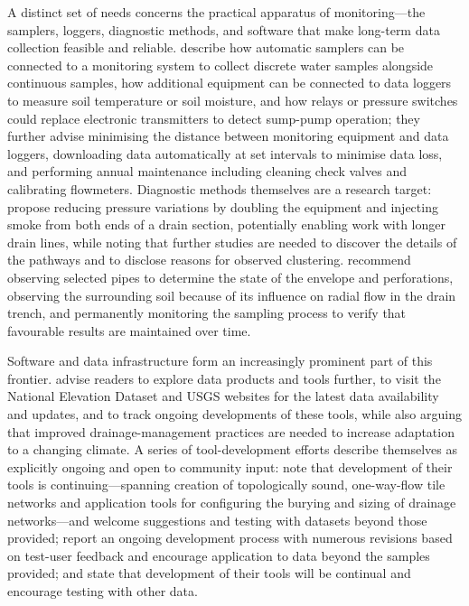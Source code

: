 \documentclass[11pt]{article}
\begin{document}
A distinct set of needs concerns the practical apparatus of monitoring---the samplers, loggers, diagnostic methods, and software that make long-term data collection feasible and reliable. \textcite{Kanwar1999} describe how automatic samplers can be connected to a monitoring system to collect discrete water samples alongside continuous samples, how additional equipment can be connected to data loggers to measure soil temperature or soil moisture, and how relays or pressure switches could replace electronic transmitters to detect sump-pump operation; they further advise minimising the distance between monitoring equipment and data loggers, downloading data automatically at set intervals to minimise data loss, and performing annual maintenance including cleaning check valves and calibrating flowmeters. Diagnostic methods themselves are a research target: \textcite{Petersen2012} propose reducing pressure variations by doubling the equipment and injecting smoke from both ends of a drain section, potentially enabling work with longer drain lines, while noting that further studies are needed to discover the details of the pathways and to disclose reasons for observed clustering. \textcite{MartínezBeltrán2007} recommend observing selected pipes to determine the state of the envelope and perforations, observing the surrounding soil because of its influence on radial flow in the drain trench, and permanently monitoring the sampling process to verify that favourable results are maintained over time.

Software and data infrastructure form an increasingly prominent part of this frontier. \textcite{Shedekar2018} advise readers to explore data products and tools further, to visit the National Elevation Dataset and USGS websites for the latest data availability and updates, and to track ongoing developments of these tools, while also arguing that improved drainage-management practices are needed to increase adaptation to a changing climate. A series of tool-development efforts describe themselves as explicitly ongoing and open to community input: \textcite{Falasy2025} note that development of their tools is continuing---spanning creation of topologically sound, one-way-flow tile networks and application tools for configuring the burying and sizing of drainage networks---and welcome suggestions and testing with datasets beyond those provided; \textcite{Falasy2025b} report an ongoing development process with numerous revisions based on test-user feedback and encourage application to data beyond the samples provided; and \textcite{Falasy2024} state that development of their tools will be continual and encourage testing with other data.
\end{document}
